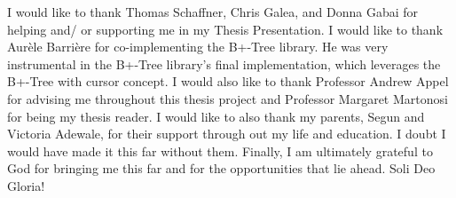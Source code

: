 I would like to thank Thomas Schaffner, Chris Galea, and Donna Gabai for helping and/ or supporting me in my Thesis Presentation. I would like to thank Aur\`ele Barri\`ere for co-implementing the B+-Tree library. He was very instrumental in the B+-Tree library's final implementation, which leverages the B+-Tree with cursor concept. I would also like to thank Professor Andrew Appel for advising me throughout this thesis project and Professor Margaret Martonosi for being my thesis reader. I would like to also thank my parents, Segun and Victoria Adewale, for their support through out my life and education. I doubt I would have made it this far without them. Finally, I am ultimately grateful to God for bringing me this far and for the opportunities that lie ahead. Soli Deo Gloria!